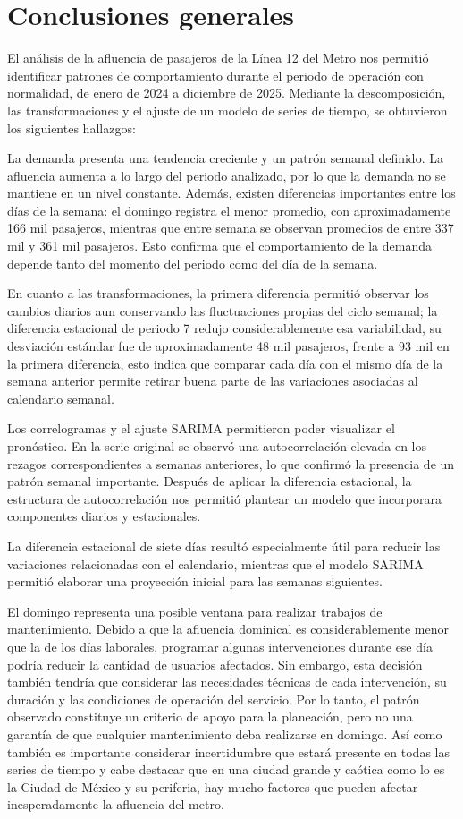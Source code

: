 \documentclass[
  12pt,
  titlepage]{article}
\begin{document}
\section{Conclusiones generales}\label{conclusiones-generales}

El análisis de la afluencia de pasajeros de la Línea 12 del Metro nos permitió identificar patrones de comportamiento durante el periodo de operación con normalidad, de enero de 2024 a diciembre de 2025. Mediante la descomposición, las transformaciones y el ajuste de un modelo de series de tiempo, se obtuvieron los siguientes hallazgos:

La demanda presenta una tendencia creciente y un patrón semanal definido. La afluencia aumenta a lo largo del periodo analizado, por lo que la demanda no se mantiene en un nivel constante. Además, existen diferencias importantes entre los días de la semana: el domingo registra el menor promedio, con aproximadamente 166 mil pasajeros, mientras que entre semana se observan promedios de entre 337 mil y 361 mil pasajeros. Esto confirma que el comportamiento de la demanda depende tanto del momento del periodo como del día de la semana.

En cuanto a las transformaciones, la primera diferencia permitió observar los cambios diarios aun conservando las fluctuaciones propias del ciclo semanal; la diferencia estacional de periodo 7 redujo considerablemente esa variabilidad, su desviación estándar fue de aproximadamente 48 mil pasajeros, frente a 93 mil en la primera diferencia, esto indica que comparar cada día con el mismo día de la semana anterior permite retirar buena parte de las variaciones asociadas al calendario semanal.

Los correlogramas y el ajuste SARIMA permitieron poder visualizar el pronóstico. En la serie original se observó una autocorrelación elevada en los rezagos correspondientes a semanas anteriores, lo que confirmó la presencia de un patrón semanal importante. Después de aplicar la diferencia estacional, la estructura de autocorrelación nos permitió plantear un modelo que incorporara componentes diarios y estacionales.

La diferencia estacional de siete días resultó especialmente útil para reducir las variaciones relacionadas con el calendario, mientras que el modelo SARIMA permitió elaborar una proyección inicial para las semanas siguientes.

El domingo representa una posible ventana para realizar trabajos de mantenimiento. Debido a que la afluencia dominical es considerablemente menor que la de los días laborales, programar algunas intervenciones durante ese día podría reducir la cantidad de usuarios afectados. Sin embargo, esta decisión también tendría que considerar las necesidades técnicas de cada intervención, su duración y las condiciones de operación del servicio. Por lo tanto, el patrón observado constituye un criterio de apoyo para la planeación, pero no una garantía de que cualquier mantenimiento deba realizarse en domingo. Así como también es importante considerar incertidumbre que estará presente en todas las series de tiempo y cabe destacar que en una ciudad grande y caótica como lo es la Ciudad de México y su periferia, hay mucho factores que pueden afectar inesperadamente la afluencia del metro.
\end{document}
